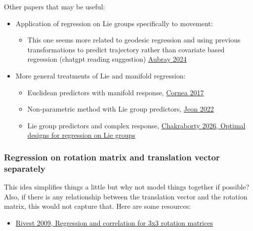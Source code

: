 \documentclass[11pt]{article}
\theoremstyle{definition}
\begin{document}
Other papers that may be useful:

\begin{itemize}
    \item Application of regression on Lie groups specifically to movement: 
    \begin{itemize}
        \item This one seems more related to geodesic regression and using previous transformations to predict trajectory rather than covariate based regression (chatgpt reading suggestion) \href{https://pmc.ncbi.nlm.nih.gov/articles/PMC11507511/}{Aubray 2024} 
    \end{itemize}
    \item More general treatments of Lie and manifold regression:
    \begin{itemize}
        \item Euclidean predictors with manifold response, \href{https://academic.oup.com/jrsssb/article/79/2/463/7041936}{Cornea 2017}
        \item Non-parametric method with Lie group predictors, \href{https://projecteuclid.org/journals/annals-of-statistics/volume-50/issue-5/Nonparametric-regression-on-Lie-groups-with-measurement-errors/10.1214/22-AOS2218.full}{Jeon 2022}
        \item Lie group predictors and complex response, \href{https://projecteuclid.org/journals/bernoulli/volume-32/issue-3/Optimal-designs-for-regression-on-Lie-groups/10.3150/25-BEJ1932.full}{Chakraborty 2026, Optimal designs for regression on Lie groups}
    \end{itemize}
\end{itemize}

\newpage

\subsubsection{Regression on rotation matrix and translation vector separately}

This idea simplifies things a little but why not model things together if possible? Also, if there is any relationship between the translation vector and the rotation matrix, this would not capture that. Here are some resources:
\begin{itemize}
    \item \href{https://onlinelibrary.wiley.com/doi/10.1002/cjs.5550340201}{Rivest 2009, Regression and correlation for 3x3 rotation matrices}
\end{itemize}
\end{document}
